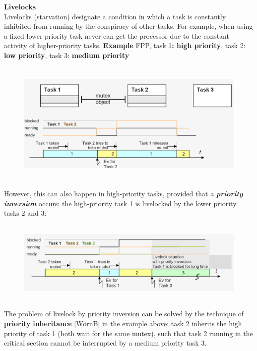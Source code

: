 {\rot\bf Livelocks}\\

Livelocks (starvation) designate a condition in which a task is constantly inhibited from running by the conspiracy of other tasks. For example, when using a fixed lower-priority task never can get the processor due to the constant activity of higher-priority tasks. \textbf{Example} FPP, task 1\textbf{: high priority}, task 2:\textbf{ low priority}, task 3:\textbf{ medium priority}

 	\begin{figure}[h]
    \centering
    \includegraphics[width=12cm, height=6cm]{Images/image109.png}
    \label{fig:Fig }
    \end{figure}

However, this can also happen in high-priority tasks, provided that a \textbf{\textit{priority inversion}} occurs: the high-priority task 1 is livelocked by the lower priority tasks 2 and 3:

 	\begin{figure}[h]
    \centering
    \includegraphics[width=12cm, height=4cm]{Images/image110.png}
    \label{fig:Fig }
    \end{figure}

The problem of livelock by priority inversion can be solved by the technique of \textbf{priority} \textbf{inheritance} [W\"{o}rnB]   in the example above: task 2 inherits the high priority of task 1 (both wait for the same mutex), such that task 2 running in the critical section cannot be interrupted by a medium priority task 3. \\

